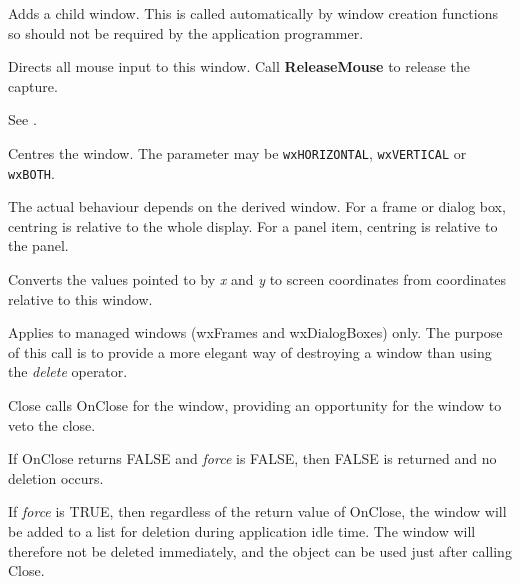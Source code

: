
Adds a child window.  This is called automatically by window creation
functions so should not be required by the application programmer.



Directs all mouse input to this window. Call {\bf ReleaseMouse} to
release the capture.



See .

\label{wincentre}


Centres the window. The parameter may be {\tt wxHORIZONTAL}, {\tt wxVERTICAL}\rtfsp
or {\tt wxBOTH}.

The actual behaviour depends on the derived window. For a frame or dialog box,
centring is relative to the whole display. For a panel item, centring is
relative to the panel.



Converts the values pointed to by {\it x} and {\it y} to screen
coordinates from coordinates relative to this window.

\label{wxwindowclose}


Applies to managed windows (wxFrames and wxDialogBoxes) only. The purpose of this call
is to provide a more elegant way of destroying a window than using the {\it delete} operator.

Close calls OnClose for the window, providing an opportunity for the window to veto the close.

If OnClose returns FALSE and {\it force} is FALSE, then FALSE is returned and no deletion occurs.

If {\it force} is TRUE, then regardless of the return value of OnClose, the window will be added to
a list for deletion during application idle time. The window will therefore not be deleted immediately,
and the object can be used just after calling Close.

